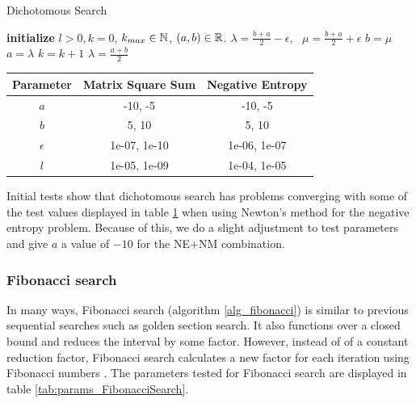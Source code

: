 \documentclass[english, 12pt, a4paper, sci, utf8, a-1b, online, table]{aaltothesis}
\newcommand{\R}{\ensuremath\mathbb{R}}
\newcommand{\N}{\ensuremath\mathbb{N}}
\begin{document}
\begin{algorithm}[H]
\caption{Dichotomous Search}
\label{alg_dichotomous}
\begin{algorithmic}[1]
\STATE \textbf{initialize} $l > 0, k = 0$, $k_{max} \in \N$, $(a, b) \in \R$.
    \STATE $\lambda = \frac{b + a}{2} - \epsilon$, \ $\mu = \frac{b + a}{2} + \epsilon$
    \IF{$\theta(\lambda) < \theta(\mu)$}
        \STATE $b = \mu$
    \ELSE
        \STATE $a = \lambda$
    \ENDIF
    \STATE $k = k + 1$
\ENDWHILE
\RETURN $\lambda = \frac{a + b}{2}$
\end{algorithmic}
\end{algorithm}

\begin{table}[H]
\label{tab:params_DichotomousSearch}
\centering
{}
\begin{tabular}{|c|c|c|}
\hline
\rowcolor{gray!25}
Parameter & Matrix Square Sum & Negative Entropy \\
\hline
$a$ & -10, -5 & -10, -5 \\
$b$ & 5, 10 & 5, 10 \\
$\epsilon$ & 1e-07, 1e-10 & 1e-06, 1e-07 \\
$l$ & 1e-05, 1e-09 & 1e-04, 1e-05 \\
\hline
\end{tabular}
\end{table}

Initial tests show that dichotomous search has problems converging with some of the test values displayed in table \ref{tab:params_DichotomousSearch} when using Newton's method for the negative entropy problem. Because of this, we do a slight adjustment to test parameters and give $a$ a value of $-10$ for the NE+NM combination.


\subsubsection{Fibonacci search}

In many ways, Fibonacci search (algorithm \ref{alg_fibonacci}) is similar to previous sequential searches such as golden section search. It also functions over a closed bound and reduces the interval by some factor. However, instead of of a constant reduction factor, Fibonacci search calculates a new factor for each iteration using Fibonacci numbers \cite{book:nonlinear_programming}. The parameters tested for Fibonacci search are displayed in table \ref{tab:params_FibonacciSearch}.
\end{document}
